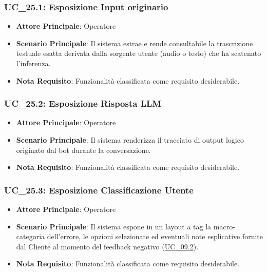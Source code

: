 \subsubsection{UC\_25.1: Esposizione Input originario}
\label{uc_25.1}
\begin{itemize}
    \item \textbf{Attore Principale}: Operatore
    \item \textbf{Scenario Principale}: Il sistema estrae e rende consultabile la trascrizione testuale esatta derivata dalla sorgente utente (audio o testo) che ha scatenato l'inferenza.
    \item \textbf{Nota Requisito}: Funzionalità classificata come requisito desiderabile.
\end{itemize}

\subsubsection{UC\_25.2: Esposizione Risposta LLM}
\label{uc_25.2}
\begin{itemize}
    \item \textbf{Attore Principale}: Operatore
    \item \textbf{Scenario Principale}: Il sistema renderizza il tracciato di output logico originato dal bot durante la conversazione.
    \item \textbf{Nota Requisito}: Funzionalità classificata come requisito desiderabile.
\end{itemize}

\subsubsection{UC\_25.3: Esposizione Classificazione Utente}
\label{uc_25.3}
\begin{itemize}
    \item \textbf{Attore Principale}: Operatore
    \item \textbf{Scenario Principale}: Il sistema espone in un layout a tag la macro-categoria dell'errore, le opzioni selezionate ed eventuali note esplicative fornite dal Cliente al momento del feedback negativo (\hyperref[uc_09.2]{UC\_09.2}).
    \item \textbf{Nota Requisito}: Funzionalità classificata come requisito desiderabile.
\end{itemize}


